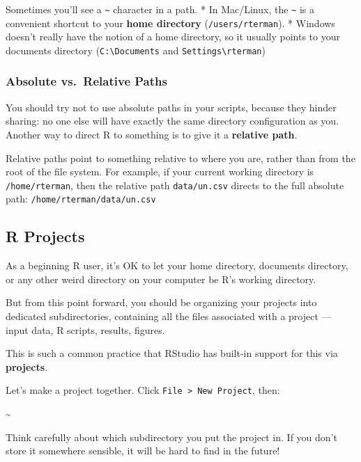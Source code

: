 \documentclass[]{book}
\begin{document}
Sometimes you'll see a \texttt{\textasciitilde{}} character in a path. *
In Mac/Linux, the \texttt{\textasciitilde{}} is a convenient shortcut to
your \textbf{home directory} (\texttt{/users/rterman}). * Windows
doesn't really have the notion of a home directory, so it usually points
to your documents directory (\texttt{C:\textbackslash{}Documents} and
\texttt{Settings\textbackslash{}rterman})

\subsubsection*{Absolute vs.~Relative
Paths}\label{absolute-vs.relative-paths}

You should try not to use absolute paths in your scripts, because they
hinder sharing: no one else will have exactly the same directory
configuration as you. Another way to direct R to something is to give it
a \textbf{relative path}.

Relative paths point to something relative to where you are, rather than
from the root of the file system. For example, if your current working
directory is \texttt{/home/rterman}, then the relative path
\texttt{data/un.csv} directs to the full absolute path:
\texttt{/home/rterman/data/un.csv}

\subsection{R Projects}\label{r-projects}

As a beginning R user, it's OK to let your home directory, documents
directory, or any other weird directory on your computer be R's working
directory.

But from this point forward, you should be organizing your projects into
dedicated subdirectories, containing all the files associated with a
project --- input data, R scripts, results, figures.

This is such a common practice that RStudio has built-in support for
this via \textbf{projects}.

Let's make a project together. Click
\texttt{File\ \textgreater{}\ New\ Project}, then:

\textasciitilde{}\href{rstudio-project-1.png}{}

Think carefully about which subdirectory you put the project in. If you
don't store it somewhere sensible, it will be hard to find in the
future!
\end{document}
